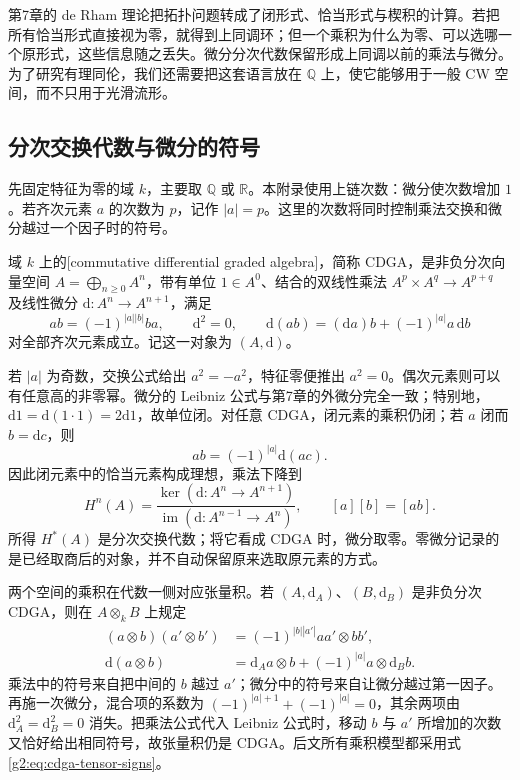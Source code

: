 第7章的 de Rham 理论把拓扑问题转成了闭形式、恰当形式与楔积的计算。若把所有恰当形式直接视为零，就得到上同调环；但一个乘积为什么为零、可以选哪一个原形式，这些信息随之丢失。微分分次代数保留形成上同调以前的乘法与微分。为了研究有理同伦，我们还需要把这套语言放在 \(\mathbb Q\) 上，使它能够用于一般 CW 空间，而不只用于光滑流形。

\subsection{分次交换代数与微分的符号}
\label{g2:subsec:E01:01}

先固定特征为零的域 \(k\)，主要取 \(\mathbb Q\) 或 \(\mathbb R\)。本附录使用上链次数：微分使次数增加 \(1\)。若齐次元素 \(a\) 的次数为 \(p\)，记作 \(|a|=p\)。这里的次数将同时控制乘法交换和微分越过一个因子时的符号。

\begin{definition}\label{g2:def:cdga}
	域 \(k\) 上的[commutative differential graded algebra]，简称 CDGA，是非负分次向量空间 \(A=\bigoplus_{n\geq0}A^n\)，带有单位 \(1\in A^0\)、结合的双线性乘法 \(A^p\times A^q\to A^{p+q}\) 及线性微分 \(\mathrm d:A^n\to A^{n+1}\)，满足
	\[
		ab=(-1)^{|a||b|}ba,\qquad \mathrm d^2=0,\qquad
		\mathrm d(ab)=(\mathrm da)b+(-1)^{|a|}a\,\mathrm db
	\]
	对全部齐次元素成立。记这一对象为 \((A,\mathrm d)\)。
\end{definition}

若 \(|a|\) 为奇数，交换公式给出 \(a^2=-a^2\)，特征零便推出 \(a^2=0\)。偶次元素则可以有任意高的非零幂。微分的 Leibniz 公式与第7章的外微分完全一致；特别地，\(\mathrm d1=\mathrm d(1\cdot1)=2\mathrm d1\)，故单位闭。对任意 CDGA，闭元素的乘积仍闭；若 \(a\) 闭而 \(b=\mathrm dc\)，则
\[
	ab=(-1)^{|a|}\mathrm d(ac).
\]
因此闭元素中的恰当元素构成理想，乘法下降到
\[
	H^n(A)=\frac{\ker(\mathrm d:A^n\to A^{n+1})}{\operatorname{im}(\mathrm d:A^{n-1}\to A^n)},\qquad
	[a][b]=[ab].
\]
所得 \(H^*(A)\) 是分次交换代数；将它看成 CDGA 时，微分取零。零微分记录的是已经取商后的对象，并不自动保留原来选取原元素的方式。

\ProseParagraphBreak

两个空间的乘积在代数一侧对应张量积。若 \((A,\mathrm d_A)\)、\((B,\mathrm d_B)\) 是非负分次 CDGA，则在 \(A\otimes_kB\) 上规定
\begin{equation}\label{g2:eq:cdga-tensor-signs}
	\begin{aligned}
		(a\otimes b)(a'\otimes b')&=(-1)^{|b||a'|}aa'\otimes bb',\\
		\mathrm d(a\otimes b)&=\mathrm d_Aa\otimes b+(-1)^{|a|}a\otimes\mathrm d_Bb.
	\end{aligned}
\end{equation}
乘法中的符号来自把中间的 \(b\) 越过 \(a'\)；微分中的符号来自让微分越过第一因子。再施一次微分，混合项的系数为 \((-1)^{|a|+1}+(-1)^{|a|}=0\)，其余两项由 \(\mathrm d_A^2=\mathrm d_B^2=0\) 消失。把乘法公式代入 Leibniz 公式时，移动 \(b\) 与 \(a'\) 所增加的次数又恰好给出相同符号，故张量积仍是 CDGA。后文所有乘积模型都采用式\eqref{g2:eq:cdga-tensor-signs}。

